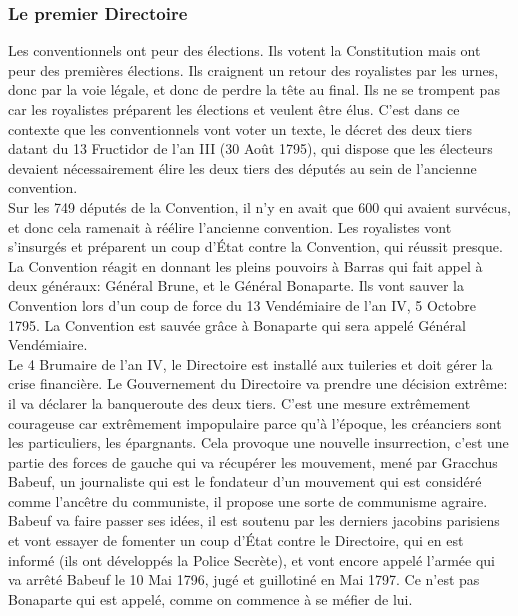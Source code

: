 \documentclass[10pt, a4paper, openany]{book}
\begin{document}
\subsubsection{Le premier Directoire}

Les conventionnels ont peur des élections. Ils votent la Constitution mais ont peur des premières élections. Ils craignent un retour des royalistes par les urnes, donc par la voie légale, et donc de perdre la tête au final. Ils ne se trompent pas car les royalistes préparent les élections et veulent être élus. C'est dans ce contexte que les conventionnels vont voter un texte, le décret des deux tiers datant du 13 Fructidor de l'an III (30 Août 1795), qui dispose que les électeurs devaient nécessairement élire les deux tiers des députés au sein de l'ancienne convention. \\
Sur les 749 députés de la Convention, il n'y en avait que 600 qui avaient survécus, et donc cela ramenait à réélire l'ancienne convention. Les royalistes vont s'insurgés et préparent un coup d'État contre la Convention, qui réussit presque. La Convention réagit en donnant les pleins pouvoirs à Barras qui fait appel à deux généraux: Général Brune, et le Général Bonaparte. Ils vont sauver la Convention lors d'un coup de force du 13 Vendémiaire de l'an IV, 5 Octobre 1795. La Convention est sauvée grâce à Bonaparte qui sera appelé Général Vendémiaire. \\
Le 4 Brumaire de l'an IV, le Directoire est installé aux tuileries et doit gérer la crise financière. Le Gouvernement du Directoire va prendre une décision extrême: il va déclarer la banqueroute des deux tiers. C'est une mesure extrêmement courageuse car extrêmement impopulaire parce qu'à l'époque, les créanciers sont les particuliers, les épargnants. Cela provoque une nouvelle insurrection, c'est une partie des forces de gauche qui va récupérer les mouvement, mené par Gracchus Babeuf, un journaliste qui est le fondateur d'un mouvement qui est considéré comme l'ancêtre du communiste, il propose une sorte de communisme agraire. \\
Babeuf va faire passer ses idées, il est soutenu par les derniers jacobins parisiens et vont essayer de fomenter un coup d'État contre le Directoire, qui en est informé (ils ont développés la Police Secrète), et vont encore appelé l'armée qui va arrêté Babeuf le 10 Mai 1796, jugé et guillotiné en Mai 1797. Ce n'est pas Bonaparte qui est appelé, comme on commence à se méfier de lui. 
\end{document}
